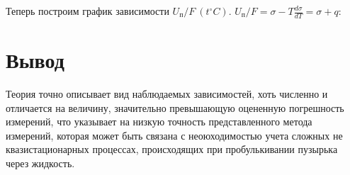 \documentclass[a4paper,11.5pt]{article} %
\begin{document}
Теперь построим график зависимости $U_\text{п}/F\ (t^\circ C)$. $U_\text{п}/F = \sigma - T\frac{d \sigma}{d T} = \sigma + q$:
\newpage
\begin{figure}[h]
	\label{gr:3}
\end{figure}



\section{Вывод}

Теория точно описывает вид наблюдаемых зависимостей, хоть численно и отличается на величину, значительно превышающую оцененную погрешность измерений, что указывает на низкую точность представленного метода измерений, которая может быть связана с неоюходимостью учета сложных не квазистационарных процессах, происходящих при пробулькивании пузырька через жидкость.
\end{document}
